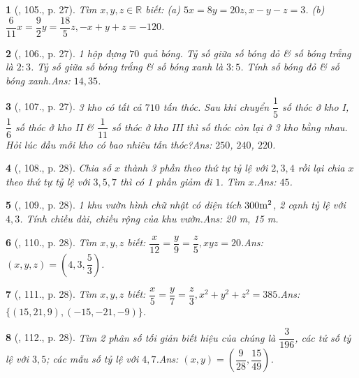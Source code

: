 \documentclass{article}
\newtheorem{baitoan}{}
\begin{document}
\begin{baitoan}[\cite{Tuyen_Toan_7}, 105., p. 27]
	Tìm $x,y,z\in\mathbb{R}$ biết: (a) $5x = 8y = 20z,x - y - z = 3$. (b) $\dfrac{6}{11}x = \dfrac{9}{2}y = \dfrac{18}{5}z,-x + y + z = -120$.
\end{baitoan}

\begin{baitoan}[\cite{Tuyen_Toan_7}, 106., p. 27]
	1 hộp đựng $70$ quả bóng. Tỷ số giữa số bóng đỏ \& số bóng trắng là $2:3$. Tỷ số giữa số bóng trắng \& số bóng xanh là $3:5$. Tính số bóng đỏ \& số bóng xanh.\hfill{\sf Ans:} $14,35$.
\end{baitoan}

\begin{baitoan}[\cite{Tuyen_Toan_7}, 107., p. 27]
	3 kho có tất cả $710$ tấn thóc. Sau khi chuyển $\dfrac{1}{5}$ số thóc ở kho I, $\dfrac{1}{6}$ số thóc ở kho II \& $\dfrac{1}{11}$ số thóc ở kho III thì số thóc còn lại ở 3 kho bằng nhau. Hỏi lúc đầu mỗi kho có bao nhiêu tấn thóc?\hfill{\sf Ans:} $250$, $240$, $220$.
\end{baitoan}

\begin{baitoan}[\cite{Tuyen_Toan_7}, 108., p. 28]
	Chia số $x$ thành 3 phần theo thứ tự tỷ lệ với $2,3,4$ rồi lại chia $x$ theo thứ tự tỷ lệ với $3,5,7$ thì có 1 phần giảm đi $1$. Tìm $x$.\hfill{\sf Ans:} $45$.
\end{baitoan}

\begin{baitoan}[\cite{Tuyen_Toan_7}, 109., p. 28]
	1 khu vườn hình chữ nhật có diện tích $\rm300m^2$, 2 cạnh tỷ lệ với $4,3$. Tính chiều dài, chiều rộng của khu vườn.\hfill{\sf Ans:} {\rm20 m, 15 m}.
\end{baitoan}

\begin{baitoan}[\cite{Tuyen_Toan_7}, 110., p. 28]
	Tìm $x,y,z$ biết: $\dfrac{x}{12} = \dfrac{y}{9} = \dfrac{z}{5},xyz = 20$.\hfill{\sf Ans:} $(x,y,z) = \left(4,3,\dfrac{5}{3}\right)$.
\end{baitoan}

\begin{baitoan}[\cite{Tuyen_Toan_7}, 111., p. 28]
	Tìm $x,y,z$ biết: $\dfrac{x}{5} = \dfrac{y}{7} = \dfrac{z}{3},x^2 + y^2 + z^2 = 385$.\hfill{\sf Ans:} $\{(15,21,9),(-15,-21,-9)\}$.
\end{baitoan}

\begin{baitoan}[\cite{Tuyen_Toan_7}, 112., p. 28]
	Tìm 2 phân số tối giản biết hiệu của chúng là $\dfrac{3}{196}$, các tử số tỷ lệ với $3,5$; các mẫu số tỷ lệ với $4,7$.\hfill{\sf Ans:} $(x,y) = \left(\dfrac{9}{28},\dfrac{15}{49}\right)$.
\end{baitoan}
\end{document}
